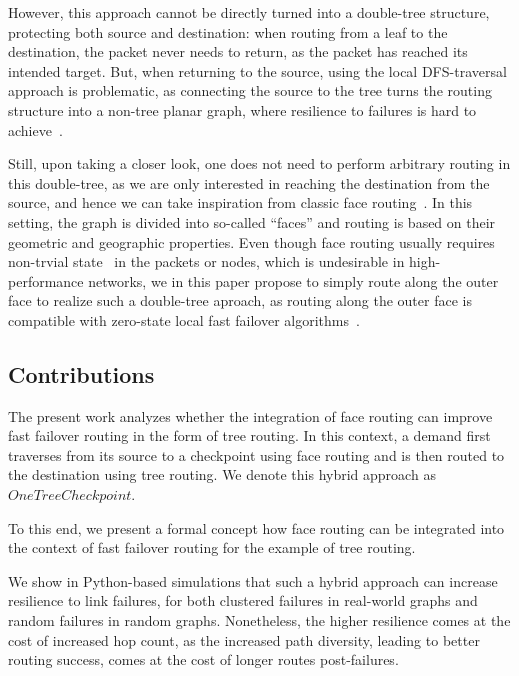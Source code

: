 \documentclass[conference]{IEEEtran}
\begin{document}
However, this approach cannot be directly turned into a double-tree structure, protecting both source and destination: when routing from a leaf to the destination, the packet never needs to return, as the packet has reached its intended target.
But, when returning to the source, using the local DFS-traversal approach is problematic, as connecting the source to the tree turns the routing structure into a non-tree planar graph, where resilience to failures is hard to achieve~\cite{DBLP:conf/apocs/FoersterHPST21,DBLP:conf/dsn/FoersterHPST22}.

Still, upon taking a closer look, one does not need to perform arbitrary routing in this double-tree, as we are only interested in reaching the destination from the source, and hence we can take inspiration from classic face routing~\cite{facerouting2, facerouting}.
 In this setting, the graph is divided into so-called ``faces'' and routing is based on their geometric and geographic properties.
 Even though face routing usually requires non-trvial state~\cite{DBLP:journals/comsur/CadgerCSM13} in the packets or nodes, which is undesirable in high-performance networks, we in this paper propose to simply route along the outer face to realize such a double-tree aproach, as routing along the outer face is compatible with zero-state local fast failover algorithms~\cite{DBLP:conf/apocs/FoersterHPST21,DBLP:conf/dsn/FoersterHPST22}.

\subsection{Contributions}
The present work analyzes whether the integration of face routing can improve fast failover routing in the form of tree routing.
In this context, a demand first traverses from its source to a checkpoint using face routing and is then routed to the destination using tree routing.
We denote this hybrid approach as  $One Tree Checkpoint$.

To this end, we present a formal concept how face routing can be integrated into the context of fast failover routing for the example of tree routing.

We show in Python-based simulations that such a hybrid approach can increase resilience to link failures, for both clustered failures in real-world graphs and random failures in random graphs. 
Nonetheless, the higher resilience comes at the cost of increased hop count, as the increased path diversity, leading to better routing success, comes at the cost of longer routes post-failures.
\end{document}
